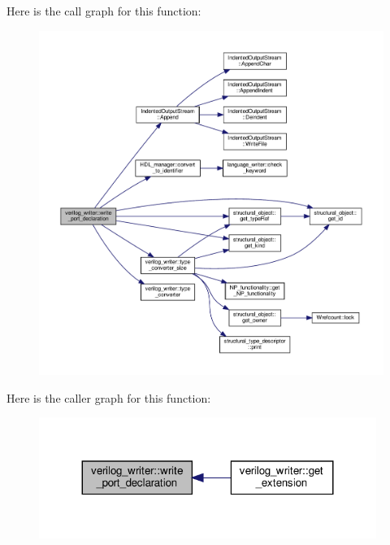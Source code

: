Here is the call graph for this function\+:
\nopagebreak
\begin{figure}[H]
\begin{center}
\leavevmode
\includegraphics[width=350pt]{d8/dba/classverilog__writer_a1b1655ecdaf1a37e7b9cf5dca23b8219_cgraph}
\end{center}
\end{figure}
Here is the caller graph for this function\+:
\nopagebreak
\begin{figure}[H]
\begin{center}
\leavevmode
\includegraphics[width=311pt]{d8/dba/classverilog__writer_a1b1655ecdaf1a37e7b9cf5dca23b8219_icgraph}
\end{center}
\end{figure}
\mbox{\label{classverilog__writer_ab1e052e8bfd33f42202ec7c834c80039}} 
